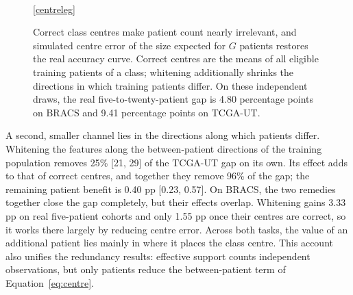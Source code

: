 \documentclass[11pt]{article}
\begin{document}
\begin{figure}[!htb]
\centering
{}\\[2pt]
\ref{centreleg}
\caption{Correct class centres make patient count nearly irrelevant, and simulated centre error of the size expected for $G$ patients restores the real accuracy curve. Correct centres are the means of all eligible training patients of a class; whitening additionally shrinks the directions in which training patients differ. On these independent draws, the real five-to-twenty-patient gap is 4.80 percentage points on BRACS and 9.41 percentage points on TCGA-UT.}
\label{fig:centre}
\end{figure}

A second, smaller channel lies in the directions along which patients differ. Whitening the features along the between-patient directions of the training population removes 25\% [21, 29] of the TCGA-UT gap on its own. Its effect adds to that of correct centres, and together they remove 96\% of the gap; the remaining patient benefit is 0.40 pp [0.23, 0.57]. On BRACS, the two remedies together close the gap completely, but their effects overlap. Whitening gains 3.33 pp on real five-patient cohorts and only 1.55 pp once their centres are correct, so it works there largely by reducing centre error. Across both tasks, the value of an additional patient lies mainly in where it places the class centre. This account also unifies the redundancy results: effective support counts independent observations, but only patients reduce the between-patient term of Equation~\eqref{eq:centre}.
\end{document}
